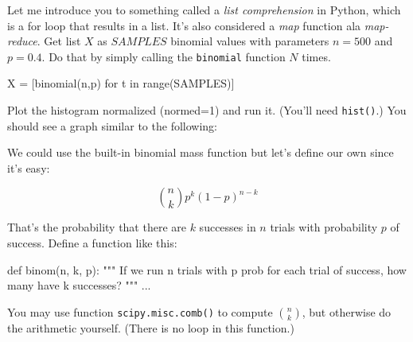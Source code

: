 \begin{fullwidth}
Let me introduce you to something called a {\em list comprehension} in Python, which is a for loop that results in a list. It's also considered a {\em map} function ala {\em map-reduce}.  Get list $X$ as $SAMPLES$ binomial values with parameters $n=500$ and $p=0.4$. Do that by simply calling the {\tt binomial} function $N$ times.

\begin{pyverbatim}
X = [binomial(n,p) for t in range(SAMPLES)]
\end{pyverbatim}

\step Plot the histogram normalized (normed=1) and run it. (You'll need {\tt hist()}.) You should see a graph similar to the following:


\step We could use the built-in binomial mass function but let's define our own since it's easy:

\[\tag{Binomial mass function}
\binom{n}{k} p^k (1-p)^{n-k}
\]

\noindent That's the probability that there are $k$ successes in $n$ trials with probability $p$ of success. Define a function like this:

\begin{pyverbatim}
def binom(n, k, p):
    """
    If we run n trials with p prob for each trial of success,
    how many have k successes?
    """
    ...
\end{pyverbatim}

\noindent You may use function {\tt scipy.misc.comb()} to compute $n \choose k$, but otherwise do the arithmetic yourself. (There is no loop in this function.)


\end{fullwidth}
